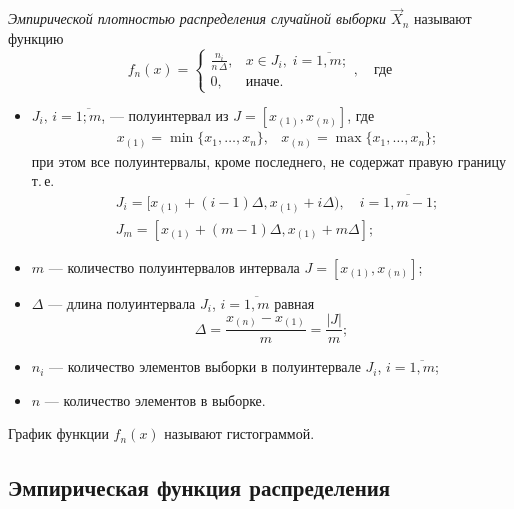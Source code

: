 \begin{defn}
    \emph{Эмпирической плотностью распределения случайной выборки $\vec{X}_n$} называют функцию
    \begin{equation}
        f_n(x) =
        \begin{cases}
            \frac{n_i}{n \, \Delta}, &x \in J_i,\; i = \overline{1, m};\\
            0, &\text{иначе}.
        \end{cases}, \quad \text{где}
    \end{equation}
    \begin{itemize}
        \item $J_i,\, i = \overline{1; m}$, --- полуинтервал из $J = [x_{(1)}, x_{(n)}]$, где 
        \begin{align}
            &x_{(1)} = \min\{ x_1, \dots, x_n \}, &x_{(n)} = \max\{ x_1, \dots, x_n \};
        \end{align}
        при этом все полуинтервалы, кроме последнего, не содержат правую границу т.\,е.
        \begin{align}
            &J_i = [ x_{(1)} + (i-1)\Delta, x_{(1)} + i\Delta), \quad i = \overline{1, m-1};
            \\
            &J_m = [ x_{(1)} + (m-1)\Delta, x_{(1)} + m\Delta];
        \end{align}
        \item $m$ --- количество полуинтервалов интервала $J = [x_{(1)}, x_{(n)}]$;
        \item $\Delta$ --- длина полуинтервала $J_i$, $i = \overline{1, m}$ равная
        \begin{equation}
            \Delta = \frac{x_{(n)} - x_{(1)}}{m} = \frac{|J|}{m};
        \end{equation}
        \item $n_i$ --- количество элементов выборки в полуинтервале $J_i$, $i = \overline{1, m}$;
        \item $n$ --- количество элементов в выборке.

    \end{itemize}
\end{defn}

\begin{defn}
    График функции $f_n(x)$ называют гистограммой.
\end{defn}

\subsection{Эмпирическая функция распределения}

